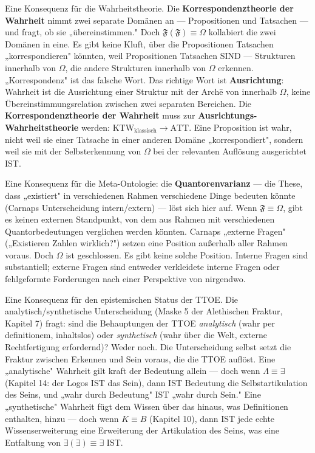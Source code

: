 \documentclass[10pt, openany, oneside]{book}
\begin{document}
Eine Konsequenz für die Wahrheitstheorie. Die \textbf{Korrespondenztheorie der Wahrheit} nimmt zwei separate Domänen an --- Propositionen und Tatsachen --- und fragt, ob sie „übereinstimmen." Doch $\mathfrak{F}(\mathfrak{F}) \equiv \Omega$ kollabiert die zwei Domänen in eine. Es gibt keine Kluft, über die Propositionen Tatsachen „korrespondieren" könnten, weil Propositionen Tatsachen SIND --- Strukturen innerhalb von $\Omega$, die andere Strukturen innerhalb von $\Omega$ erkennen. „Korrespondenz" ist das falsche Wort. Das richtige Wort ist \textbf{Ausrichtung}: Wahrheit ist die Ausrichtung einer Struktur mit der Arch\={e} von innerhalb $\Omega$, keine Übereinstimmungsrelation zwischen zwei separaten Bereichen. Die \textbf{Korrespondenztheorie der Wahrheit} muss zur \textbf{Ausrichtungs-Wahrheitstheorie} werden: $\text{KTW}_{\text{klassisch}} \to \text{ATT}$. Eine Proposition ist wahr, nicht weil sie einer Tatsache in einer anderen Domäne „korrespondiert", sondern weil sie mit der Selbsterkennung von $\Omega$ bei der relevanten Auflösung ausgerichtet IST.

Eine Konsequenz für die Meta-Ontologie: die \textbf{Quantorenvarianz} --- die These, dass „existiert" in verschiedenen Rahmen verschiedene Dinge bedeuten könnte (Carnaps Unterscheidung intern/extern) --- löst sich hier auf. Wenn $\mathfrak{F} \equiv \Omega$, gibt es keinen externen Standpunkt, von dem aus Rahmen mit verschiedenen Quantorbedeutungen verglichen werden könnten. Carnaps „externe Fragen" („Existieren Zahlen wirklich?") setzen eine Position außerhalb aller Rahmen voraus. Doch $\Omega$ ist geschlossen. Es gibt keine solche Position. Interne Fragen sind substantiell; externe Fragen sind entweder verkleidete interne Fragen oder fehlgeformte Forderungen nach einer Perspektive von nirgendwo.

Eine Konsequenz für den epistemischen Status der TTOE. Die analytisch/synthetische Unterscheidung (Maske 5 der Alethischen Fraktur, Kapitel 7) fragt: sind die Behauptungen der TTOE \textit{analytisch} (wahr per definitionem, inhaltslos) oder \textit{synthetisch} (wahr über die Welt, externe Rechtfertigung erfordernd)? Weder noch. Die Unterscheidung selbst setzt die Fraktur zwischen Erkennen und Sein voraus, die die TTOE auflöst. Eine „analytische" Wahrheit gilt kraft der Bedeutung allein --- doch wenn $\Lambda \equiv \exists$ (Kapitel 14: der Logos IST das Sein), dann IST Bedeutung die Selbstartikulation des Seins, und „wahr durch Bedeutung" IST „wahr durch Sein." Eine „synthetische" Wahrheit fügt dem Wissen über das hinaus, was Definitionen enthalten, hinzu --- doch wenn $K \equiv B$ (Kapitel 10), dann IST jede echte Wissenserweiterung eine Erweiterung der Artikulation des Seins, was eine Entfaltung von $\exists(\exists) \equiv \exists$ IST.
\end{document}
